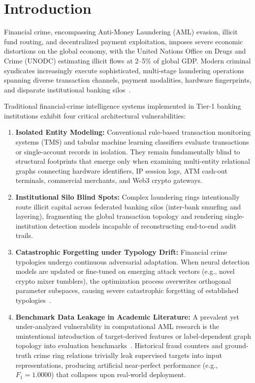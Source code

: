 \section{Introduction}
\label{sec:intro}

Financial crime, encompassing Anti-Money Laundering (AML) evasion, illicit fund routing, and decentralized payment exploitation, imposes severe economic distortions on the global economy, with the United Nations Office on Drugs and Crime (UNODC) estimating illicit flows at 2--5\% of global GDP. Modern criminal syndicates increasingly execute sophisticated, multi-stage laundering operations spanning diverse transaction channels, payment modalities, hardware fingerprints, and disparate institutional banking silos~\cite{weber2019anti}. 

Traditional financial-crime intelligence systems implemented in Tier-1 banking institutions exhibit four critical architectural vulnerabilities:
\begin{enumerate}
    \item \textbf{Isolated Entity Modeling:} Conventional rule-based transaction monitoring systems (TMS) and tabular machine learning classifiers evaluate transactions or single-account records in isolation. They remain fundamentally blind to structural footprints that emerge only when examining multi-entity relational graphs connecting hardware identifiers, IP session logs, ATM cash-out terminals, commercial merchants, and Web3 crypto gateways.
    \item \textbf{Institutional Silo Blind Spots:} Complex laundering rings intentionally route illicit capital across federated banking silos (inter-bank smurfing and layering), fragmenting the global transaction topology and rendering single-institution detection models incapable of reconstructing end-to-end audit trails.
    \item \textbf{Catastrophic Forgetting under Typology Drift:} Financial crime typologies undergo continuous adversarial adaptation. When neural detection models are updated or fine-tuned on emerging attack vectors (e.g., novel crypto mixer tumblers), the optimization process overwrites orthogonal parameter subspaces, causing severe catastrophic forgetting of established typologies~\cite{kirkpatrick2017overcoming,parisi2019continual}.
    \item \textbf{Benchmark Data Leakage in Academic Literature:} A prevalent yet under-analyzed vulnerability in computational AML research is the unintentional introduction of target-derived features or label-dependent graph topology into evaluation benchmarks~\cite{kaufman2012leakage,kapoor2023leakage}. Historical fraud counters and ground-truth crime ring relations trivially leak supervised targets into input representations, producing artificial near-perfect performance (e.g., $F_1 = 1.0000$) that collapses upon real-world deployment.
\end{enumerate}


